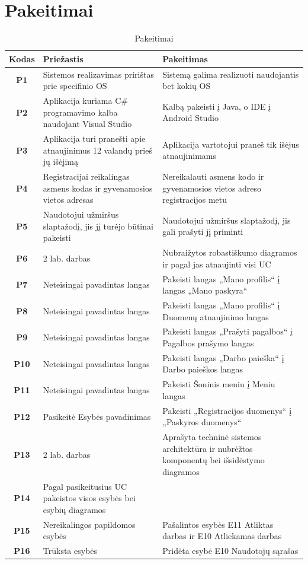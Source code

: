 \documentclass{VUMIFPSbakalaurinis}
\begin{document}
\appendix
\section{Pakeitimai}
\begin{table}[H]\footnotesize
	\centering
	\caption{Pakeitimai}
	{
	\setlength{\arrayrulewidth}{0.25mm}
	{\begin{tabular}{|c|m{5.75cm}|m{5.75cm}|} \hline
		Kodas & Priežastis & Pakeitimas \\
		\hline
		\textbf{P1} & Sistemos realizavimas pririštas prie specifinio OS & Sistemą galima realizuoti naudojantis bet kokių OS \\
		\textbf{P2} & Aplikacija kuriama C\# programavimo kalba naudojant Visual Studio & Kalbą pakeisti į Java, o IDE į Android Studio \\
		\textbf{P3} & Aplikacija turi pranešti apie atnaujinimus 12 valandų prieš jų išėjimą & Aplikacija vartotojui praneš tik išėjus atnaujinimams \\
		\textbf{P4} & Registracijai reikalingas asmens kodas ir gyvenamosios vietos adresas & Nereikalauti asmens kodo ir gyvenamosios vietos adreso registracijos metu \\
		\textbf{P5} & Naudotojui užmiršus slaptažodį, jis jį turėjo būtinai pakeisti & Naudotojui užmiršus slaptažodį, jis gali prašyti jį priminti \\
		\textbf{P6} & 2 lab. darbas & Nubraižytos robastiškumo diagramos ir pagal jas atnaujinti visi UC \\
		\textbf{P7} & Neteisingai pavadintas langas & Pakeisti langas  „Mano profilis“ į  langas „Mano paskyra“ \\
		\textbf{P8} & Neteisingai pavadintas langas & Pakeisti langas  „Mano profilis“ į Duomenų atnaujinimo langas \\
		\textbf{P9} & Neteisingai pavadintas langas & Pakeisti langas  „Prašyti pagalbos“ į Pagalbos prašymo langas \\
		\textbf{P10} & Neteisingai pavadintas langas & Pakeisti langas  „Darbo paieška“ į Darbo paieškos langas \\
		\textbf{P11} & Neteisingai pavadintas langas & Pakeisti Šoninis meniu į Meniu langas \\
		\textbf{P12} & Pasikeitė Esybės pavadinimas & Pakeisti „Registracijos duomenys“ į „Paskyros duomenys“ \\
		\textbf{P13} & 2 lab. darbas & Aprašyta techninė sistemos architektūra ir nubrėžtos komponentų bei išsidėstymo diagramos \\
		\textbf{P14} & Pagal pasikeitusius UC pakeistos visos esybės bei esybių diagramos & \\
		\textbf{P15} & Nereikalingos papildomos esybės & Pašalintos esybės E11 Atliktas darbas ir E10 Atliekamas darbas \\
		\textbf{P16} & Trūksta esybės & Pridėta esybė E10 Naudotojų sąrašas \\
		\hline
	\end{tabular}}
	}
	\label{tab:mistake table}
\end{table}
\end{document}
